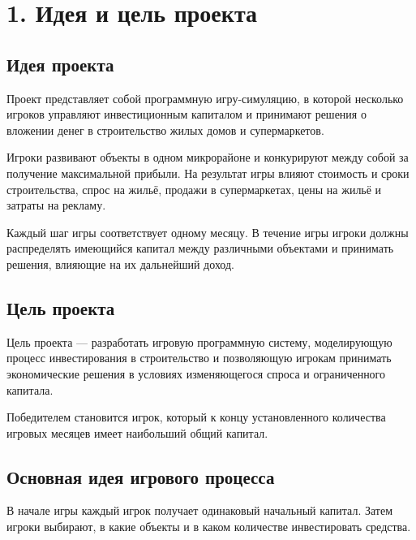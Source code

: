 \documentclass[
]{article}
\author{}
\date{}
\begin{document}
\section{1. Идея и цель
проекта}\label{ux438ux434ux435ux44f-ux438-ux446ux435ux43bux44c-ux43fux440ux43eux435ux43aux442ux430}

\subsection{Идея
проекта}\label{ux438ux434ux435ux44f-ux43fux440ux43eux435ux43aux442ux430}

Проект представляет собой программную игру-симуляцию, в которой
несколько игроков управляют инвестиционным капиталом и принимают решения
о вложении денег в строительство жилых домов и супермаркетов.

Игроки развивают объекты в одном микрорайоне и конкурируют между собой
за получение максимальной прибыли. На результат игры влияют стоимость и
сроки строительства, спрос на жильё, продажи в супермаркетах, цены на
жильё и затраты на рекламу.

Каждый шаг игры соответствует одному месяцу. В течение игры игроки
должны распределять имеющийся капитал между различными объектами и
принимать решения, влияющие на их дальнейший доход.

\subsection{Цель
проекта}\label{ux446ux435ux43bux44c-ux43fux440ux43eux435ux43aux442ux430}

Цель проекта --- разработать игровую программную систему, моделирующую
процесс инвестирования в строительство и позволяющую игрокам принимать
экономические решения в условиях изменяющегося спроса и ограниченного
капитала.

Победителем становится игрок, который к концу установленного количества
игровых месяцев имеет наибольший общий капитал.

\subsection{Основная идея игрового
процесса}\label{ux43eux441ux43dux43eux432ux43dux430ux44f-ux438ux434ux435ux44f-ux438ux433ux440ux43eux432ux43eux433ux43e-ux43fux440ux43eux446ux435ux441ux441ux430}

В начале игры каждый игрок получает одинаковый начальный капитал. Затем
игроки выбирают, в какие объекты и в каком количестве инвестировать
средства.
\end{document}
